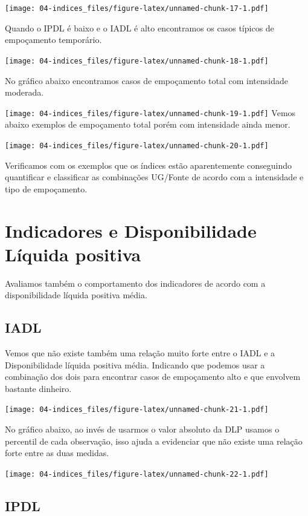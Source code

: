 \documentclass[
]{book}
\begin{document}
\texttt{[image: 04-indices\_files/figure-latex/unnamed-chunk-17-1.pdf]}

Quando o IPDL é baixo e o IADL é alto encontramos os casos típicos de empoçamento temporário.

\texttt{[image: 04-indices\_files/figure-latex/unnamed-chunk-18-1.pdf]}

No gráfico abaixo encontramos casos de empoçamento total com intensidade moderada.

\texttt{[image: 04-indices\_files/figure-latex/unnamed-chunk-19-1.pdf]}
Vemos abaixo exemplos de empoçamento total porém com intensidade ainda menor.

\texttt{[image: 04-indices\_files/figure-latex/unnamed-chunk-20-1.pdf]}

Verificamos com os exemplos que os índices estão aparentemente conseguindo quantificar e classificar as combinações UG/Fonte de acordo com a intensidade e tipo de empoçamento.

\hypertarget{indicadores-e-disponibilidade-luxedquida-positiva}{%
\section{Indicadores e Disponibilidade Líquida positiva}\label{indicadores-e-disponibilidade-luxedquida-positiva}}

Avaliamos também o comportamento dos indicadores de acordo com a disponibilidade líquida positiva média.

\hypertarget{iadl}{%
\subsection{IADL}\label{iadl}}

Vemos que não existe também uma relação muito forte entre o IADL e a Disponibilidade líquida positiva média. Indicando que podemos usar a combinação dos dois para encontrar casos de empoçamento alto e que envolvem bastante dinheiro.

\texttt{[image: 04-indices\_files/figure-latex/unnamed-chunk-21-1.pdf]}

No gráfico abaixo, ao invés de usarmos o valor absoluto da DLP usamos o percentil de cada observação, isso ajuda a evidenciar que não existe uma relação forte entre as duas medidas.

\texttt{[image: 04-indices\_files/figure-latex/unnamed-chunk-22-1.pdf]}

\hypertarget{ipdl}{%
\subsection{IPDL}\label{ipdl}}
\end{document}
